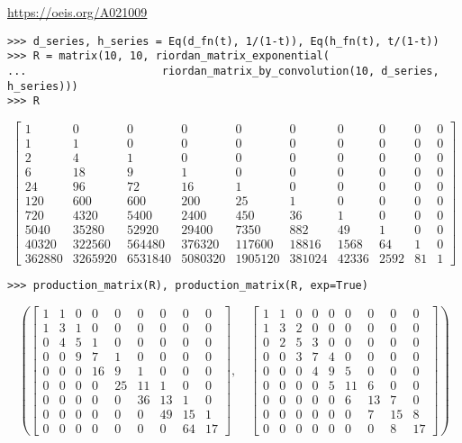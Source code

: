 \begin{example}
\url{https://oeis.org/A021009}
\begin{verbatim}
>>> d_series, h_series = Eq(d_fn(t), 1/(1-t)), Eq(h_fn(t), t/(1-t))
>>> R = matrix(10, 10, riordan_matrix_exponential(
...                     riordan_matrix_by_convolution(10, d_series, h_series)))
>>> R
\end{verbatim}
\begin{displaymath}
\left[\begin{matrix}1 & 0 & 0 & 0 & 0 & 0 & 0 & 0 & 0 & 0\\1 & 1 & 0 & 0 & 0 & 0 & 0 & 0 & 0 & 0\\2 & 4 & 1 & 0 & 0 & 0 & 0 & 0 & 0 & 0\\6 & 18 & 9 & 1 & 0 & 0 & 0 & 0 & 0 & 0\\24 & 96 & 72 & 16 & 1 & 0 & 0 & 0 & 0 & 0\\120 & 600 & 600 & 200 & 25 & 1 & 0 & 0 & 0 & 0\\720 & 4320 & 5400 & 2400 & 450 & 36 & 1 & 0 & 0 & 0\\5040 & 35280 & 52920 & 29400 & 7350 & 882 & 49 & 1 & 0 & 0\\40320 & 322560 & 564480 & 376320 & 117600 & 18816 & 1568 & 64 & 1 & 0\\362880 & 3265920 & 6531840 & 5080320 & 1905120 & 381024 & 42336 & 2592 & 81 & 1\end{matrix}\right]
\end{displaymath}
\begin{verbatim}
>>> production_matrix(R), production_matrix(R, exp=True)
\end{verbatim}
\begin{displaymath}
\left ( \left[\begin{matrix}1 & 1 & 0 & 0 & 0 & 0 & 0 & 0 & 0\\1 & 3 & 1 & 0 & 0 & 0 & 0 & 0 & 0\\0 & 4 & 5 & 1 & 0 & 0 & 0 & 0 & 0\\0 & 0 & 9 & 7 & 1 & 0 & 0 & 0 & 0\\0 & 0 & 0 & 16 & 9 & 1 & 0 & 0 & 0\\0 & 0 & 0 & 0 & 25 & 11 & 1 & 0 & 0\\0 & 0 & 0 & 0 & 0 & 36 & 13 & 1 & 0\\0 & 0 & 0 & 0 & 0 & 0 & 49 & 15 & 1\\0 & 0 & 0 & 0 & 0 & 0 & 0 & 64 & 17\end{matrix}\right], \quad \left[\begin{matrix}1 & 1 & 0 & 0 & 0 & 0 & 0 & 0 & 0\\1 & 3 & 2 & 0 & 0 & 0 & 0 & 0 & 0\\0 & 2 & 5 & 3 & 0 & 0 & 0 & 0 & 0\\0 & 0 & 3 & 7 & 4 & 0 & 0 & 0 & 0\\0 & 0 & 0 & 4 & 9 & 5 & 0 & 0 & 0\\0 & 0 & 0 & 0 & 5 & 11 & 6 & 0 & 0\\0 & 0 & 0 & 0 & 0 & 6 & 13 & 7 & 0\\0 & 0 & 0 & 0 & 0 & 0 & 7 & 15 & 8\\0 & 0 & 0 & 0 & 0 & 0 & 0 & 8 & 17\end{matrix}\right]\right )

\end{displaymath}
\end{example}
